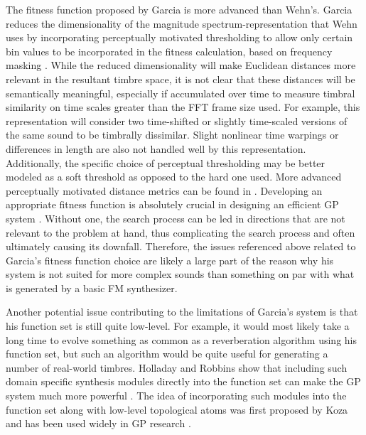 \documentclass[12pt]{report} 	%
\numberwithin{figure}{chapter}
\numberwithin{table}{chapter}
\numberwithin{equation}{chapter}
\begin{document}
\begin{flushleft}
The fitness function proposed by Garcia is more advanced than Wehn's. Garcia reduces the dimensionality of the magnitude spectrum-representation that Wehn uses by incorporating perceptually motivated thresholding to allow only certain bin values to be incorporated in the fitness calculation, based on frequency masking \cite[p. 6]{Garcia:2002cq}. While the reduced dimensionality will make Euclidean distances more relevant in the resultant timbre space, it is not clear that these distances will be semantically meaningful, especially if accumulated over time to measure timbral similarity on time scales greater than the FFT frame size used. For example, this representation will consider two time-shifted or slightly time-scaled versions of the same sound to be timbrally dissimilar. Slight nonlinear time warpings or differences in length are also not handled well by this representation. Additionally, the specific choice of perceptual thresholding may be better modeled as a soft threshold as opposed to the hard one used. More advanced perceptually motivated distance metrics can be found in \cite{Riionheimo:2003qo, Jehan:2005fy}. Developing an appropriate fitness function is absolutely crucial in designing an efficient GP system \cite[p. 3]{McDermott:2006ud}. Without one, the search process can be led in directions that are not relevant to the problem at hand, thus complicating the search process and often ultimately causing its downfall. Therefore, the issues referenced above related to Garcia's fitness function choice are likely a large part of the reason why his system is not suited for more complex sounds than something on par with what is generated by a basic FM synthesizer.

Another potential issue contributing to the limitations of Garcia's system is that his function set is still quite low-level. For example, it would most likely take a long time to evolve something as common as a reverberation algorithm using his function set, but such an algorithm would be quite useful for generating a number of real-world timbres. Holladay and Robbins show that including such domain specific synthesis modules directly into the function set can make the GP system much more powerful \cite[p. 4]{Holladay:2007ct}. The idea of incorporating such modules into the function set along with low-level topological atoms was first proposed by Koza and has been used widely in GP research \cite{Koza:1992gp}.


\end{flushleft}
\end{document}
